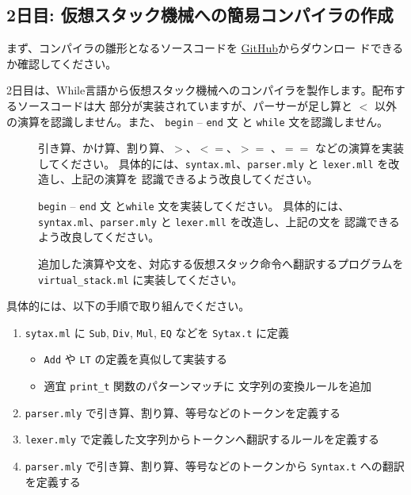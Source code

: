 \documentclass[a4paper,11pt]{jsarticle}
\begin{document}
\subsection{2日目: 仮想スタック機械への簡易コンパイラの作成}

まず、コンパイラの雛形となるソースコードを
\href{https://github.com/tmu-compiler-info-sys-exp-I/compiler-day2}{GitHub}からダウンロー
ドできるか確認してください。

2日目は、While言語から仮想スタック機械へのコンパイラを製作します。配布するソースコードは大
部分が実装されていますが、パーサーが足し算と $<$ 以外の演算を認識しません。また、
\verb|begin| -- \verb|end| 文 と \verb|while| 文を認識しません。

\begin{description}
\item [] 引き算、かけ算、割り算、$>$、$<=$、$>=$ 、$==$ などの演算を実装してください。
  具体的には、\verb|syntax.ml|、\verb|parser.mly| と \verb|lexer.mll| を改造し、上記の演算を
  認識できるよう改良してください。
\item [] \verb|begin| -- \verb|end| 文 と\verb|while| 文を実装してください。
  具体的には、\verb|syntax.ml|、\verb|parser.mly| と \verb|lexer.mll| を改造し、上記の文を
  認識できるよう改良してください。
\item [] 追加した演算や文を、対応する仮想スタック命令へ翻訳するプログラムを
  \verb|virtual_stack.ml| に実装してください。
\end{description}

具体的には、以下の手順で取り組んでください。

\noindent{}

\begin{enumerate}
\item \verb|sytax.ml| に \verb|Sub|, \verb|Div|, \verb|Mul|, \verb|EQ| などを
  \verb|Sytax.t| に定義
  \begin{itemize}
  \item \verb|Add| や \verb|LT| の定義を真似して実装する
  \item 適宜 \verb|print_t| 関数のパターンマッチに 文字列の変換ルールを追加
  \end{itemize}
\item \verb|parser.mly| で引き算、割り算、等号などのトークンを定義する
\item \verb|lexer.mly| で定義した文字列からトークンへ翻訳するルールを定義する
\item \verb|parser.mly| で引き算、割り算、等号などのトークンから \verb|Syntax.t| への翻訳
  を定義する
\end{enumerate}
\end{document}
